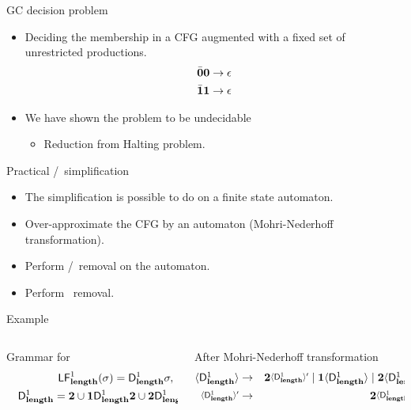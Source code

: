 \documentclass[xcolor=x11names,compress,mathserif]{beamer}
\renewcommand{\(}{\begin{columns}}
\renewcommand{\)}{\end{columns}}
\newcommand{\<}[1]{\begin{column}{#1}}
\renewcommand{\>}{\end{column}}
\begin{document}
\begin{frame}{GC decision problem}
\begin{itemize}
\item Deciding the
  membership in  a CFG augmented  with a
  fixed set of unrestricted productions.
  \begin{align*}
    \bar{\mathbf{0}}\mathbf{0}    \rightarrow    \epsilon\\
    \bar{\mathbf{1}}\mathbf{1}    \rightarrow   \epsilon\\
  \end{align*}
\item We have shown the problem to be undecidable
  \begin{itemize}
  \item Reduction from Halting problem.
  \end{itemize}
\end{itemize}
\end{frame}
\begin{frame}{Practical \bcar/\bcdr\  simplification}

\begin{itemize}
\item The simplification is possible to do on a finite state automaton.
\item Over-approximate the CFG by an automaton
  (Mohri-Nederhoff transformation).
\item Perform \acar/\acdr\ removal on the automaton.
\item Perform \clazy\ removal.
\end{itemize}

\end{frame}
\begin{frame}{Example}
  \scriptsize
  \begin{columns}[c]
    \begin{column}[T]{.5\textwidth}
      {Grammar for }
      \begin{eqnarray*}
        &&  \mathsf{LF}_{\mathit {\mathbf{length}} }^{1}( {\mathit \sigma}) = \mathsf{D}_{\mathit {\mathbf{length}}}^{1}\sigma,~\mbox{and}\\
        &&   \mathsf{D}_{\mathit {\mathbf{length}}}^{1} = {\mathbf{2}} \cup \mathbf{1}\mathsf{D}_{\mathit {\mathbf{length}}}^{1}{\mathbf{2}}
        \cup {\mathbf{2}}\mathsf{D}_{\mathit {\mathbf{length}}}^{1}{{\mathbf{2}}}
      \end{eqnarray*}
    \end{column}
    \begin{column}[T]{.5\textwidth}
      After Mohri-Nederhoff transformation
       \begin{eqnarray*}              
         \var{\Df{\plength}{1}}   &\rightarrow&   \clazy\varnew{\Df{\plength}{1}}
         \mid                 \acdr\var{\Df{\plength}{1}}                 \mid
         \clazy\var{\Df{\plength}{1}}\\  \varnew{\Df{\plength}{1}}  &\rightarrow&
         \clazy\varnew{\Df{\plength}{1}} \mid \epsilon
       \end{eqnarray*}
    \end{column}
  \end{columns}
\end{frame}
\end{document}
